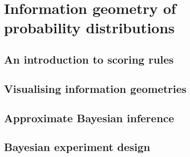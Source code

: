 \part{Information geometry of probability distributions}

\chapter{An introduction to scoring rules}



\chapter{Visualising information geometries}



\chapter{Approximate Bayesian inference}



\chapter{Bayesian experiment design}


